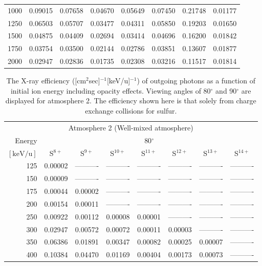 \begin{table}[ht]
\begin{tabular}{r|c|c|c|c|c|c|c}
     1000 & 0.09015 & 0.07658 & 0.04670 & 0.05649 & 0.07450 & 0.21748 & 0.01177 \\
     1250 & 0.06503 & 0.05707 & 0.03477 & 0.04311 & 0.05850 & 0.19203 & 0.01650 \\
     1500 & 0.04875 & 0.04409 & 0.02694 & 0.03414 & 0.04696 & 0.16200 & 0.01842 \\
     1750 & 0.03754 & 0.03500 & 0.02144 & 0.02786 & 0.03851 & 0.13607 & 0.01877 \\
     2000 & 0.02947 & 0.02836 & 0.01735 & 0.02308 & 0.03216 & 0.11517 & 0.01814 \\ \cline{1-8}
    \end{tabular}
    \label{tab:XRayEffSCX3}
\end{table}

\begin{table}[ht]
    \centering
    \caption{The X-ray efficiency ([cm$^2$sec]$^{-1}$[keV/u]$^{-1}$) of outgoing photons as a function of initial ion energy including opacity effects. Viewing angles of 80$^\circ$ and 90$^\circ$ are displayed for atmosphere 2. The efficiency shown here is that solely from charge exchange collisions for sulfur.}
    \begin{tabular}{r|c|c|c|c|c|c|c}
    \multicolumn{8}{c}{Atmosphere 2 (Well-mixed atmosphere)} \\ \cline{2-8}
    Energy & \multicolumn{7}{c}{80$^\circ$} \\ \cline{2-8}
    $\mathrm{[keV/u]}$ & S$^{8+}$ & S$^{9+}$ & S$^{10+}$ & S$^{11+}$ & S$^{12+}$ & S$^{13+}$ & S$^{14+}$ \\ \cline{1-8}
      125 & 0.00002 & ---------- & ---------- & ---------- & ---------- & ---------- & ---------- \\
      150 & 0.00009 & ---------- & ---------- & ---------- & ---------- & ---------- & ---------- \\
      175 & 0.00044 & 0.00002 & ---------- & ---------- & ---------- & ---------- & ---------- \\
      200 & 0.00154 & 0.00011 & ---------- & ---------- & ---------- & ---------- & ---------- \\
      250 & 0.00922 & 0.00112 & 0.00008 & 0.00001 & ---------- & ---------- & ---------- \\
      300 & 0.02947 & 0.00572 & 0.00072 & 0.00011 & 0.00003 & ---------- & ---------- \\
      350 & 0.06386 & 0.01891 & 0.00347 & 0.00082 & 0.00025 & 0.00007 & ---------- \\
      400 & 0.10384 & 0.04470 & 0.01169 & 0.00404 & 0.00173 & 0.00073 & ---------- \\

\end{tabular}
\end{table}
